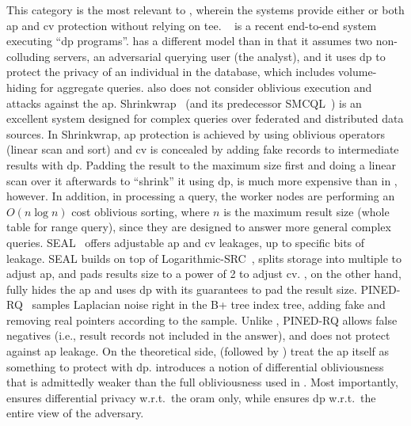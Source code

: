 			This category is the most relevant to \epsolute{}, wherein the systems provide either or both \acrshort{ap} and \acrshort{cv} protection without relying on \acrshort{tee}.
			\crypte{}~\cite{crypte} is a recent end-to-end system executing ``\acrshort{dp} programs''.
			\crypte{} has a different model than \epsolute{} in that it assumes two non-colluding servers, an adversarial querying user (the analyst), and it uses \acrshort{dp} to protect the privacy of an individual in the database, which includes volume-hiding for aggregate queries.
			\crypte{} also does not consider oblivious execution and attacks against the \acrshort{ap}.
			Shrinkwrap~\cite{shrinkwrap} (and its predecessor SMCQL~\cite{smcql}) is an excellent system designed for complex queries over federated and distributed data sources.
			In Shrinkwrap, \acrshort{ap} protection is achieved by using oblivious operators (linear scan and sort) and \acrshort{cv} is concealed by adding fake records to intermediate results with \acrshort{dp}.
			Padding the result to the maximum size first and doing a linear scan over it afterwards to ``shrink'' it using \acrshort{dp}, is much more expensive than in \epsolute{}, however.
			In addition, in processing a query, the worker nodes are performing an $O(n \log{n})$ cost oblivious sorting, where $n$ is the maximum result size (whole table for range query), since they are designed to answer more general complex queries.
			SEAL~\cite{seal} offers adjustable \acrshort{ap} and \acrshort{cv} leakages, up to specific bits of leakage.
			SEAL builds on top of Logarithmic-SRC~\cite{practical-range-search}, splits storage into multiple  to adjust \acrshort{ap}, and pads results size to a power of 2 to adjust \acrshort{cv}.
			\epsolute{}, on the other hand, fully hides the \acrshort{ap} and uses \acrshort{dp} with its guarantees to pad the result size.
			PINED-RQ~\cite{pined-rq} samples Laplacian noise right in the B+ tree index tree, adding fake and removing real pointers according to the sample.
			Unlike \epsolute{}, PINED-RQ allows false negatives (i.e., result records not included in the answer), and does not protect against \acrshort{ap} leakage.
			On the theoretical side, \textcite{differential-obliviousness} (followed by \textcite{differential-obliviousness-followup}) treat the \acrshort{ap} itself as something to protect with \acrshort{dp}.
			\cite{differential-obliviousness} introduces a notion of differential obliviousness that is admittedly weaker than the full obliviousness used in \epsolute{}. %
			Most importantly, \cite{differential-obliviousness} ensures differential privacy w.r.t.~the \acrshort{oram} only, while \epsolute{} ensures \acrshort{dp} w.r.t.~the entire view of the adversary. %


